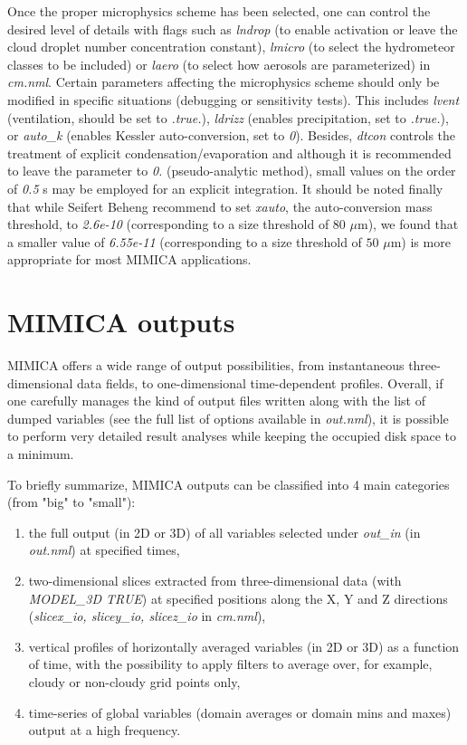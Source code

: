 \documentclass[12pt,A4,french]{article}
\begin{document}
Once the proper microphysics scheme has been selected, one can control the desired level of details with flags such as {\it lndrop} (to enable activation or leave the cloud droplet number concentration constant), {\it lmicro} (to select the hydrometeor classes to be included) or {\it laero} (to select how aerosols are parameterized) in {\it cm.nml}. Certain parameters affecting the microphysics scheme should only be modified in specific situations (debugging or sensitivity tests). This includes {\it lvent} (ventilation, should be set to {\it .true.}), {\it ldrizz} (enables precipitation, set to {\it .true.}), or {\it auto\_k} (enables Kessler auto-conversion, set to {\it 0}). Besides, {\it dtcon} controls the treatment of explicit condensation/evaporation and although it is recommended to leave the parameter to {\it 0.} (pseudo-analytic method), small values on the order of {\it 0.5} s may be employed for an explicit integration. It should be noted finally that while Seifert Beheng recommend to set {\it xauto}, the auto-conversion mass threshold, to {\it 2.6e-10} (corresponding to a size threshold of $80$ $\mu$m), we found that a smaller value of {\it 6.55e-11} (corresponding to a size threshold of $50$ $\mu$m) is more appropriate for most MIMICA applications.

\newpage
\section{MIMICA outputs}
\label{outputs}

MIMICA offers a wide range of output possibilities, from instantaneous three-dimensional data fields, to one-dimensional time-dependent profiles. Overall, if one carefully manages the kind of output files written along with the list of dumped variables (see the full list of options available in {\it out.nml}), it is possible to perform very detailed result analyses while keeping the occupied disk space to a minimum.

To briefly summarize, MIMICA outputs can be classified into 4 main categories (from "big" to "small"):
\begin{enumerate}
    \item the full output (in 2D or 3D) of all variables selected under {\it out\_in} (in {\it out.nml}) at specified times,
    \item two-dimensional slices extracted from three-dimensional data  (with {\it MODEL\_3D TRUE}) at specified positions along the X, Y and Z directions ({\it slicex\_io, slicey\_io, slicez\_io} in {\it cm.nml}),
    \item vertical profiles of horizontally averaged variables (in 2D or 3D) as a function of time, with the possibility to apply filters to average over, for example, cloudy or non-cloudy grid points only, 
    \item time-series of global variables (domain averages or domain mins and maxes) output at a high frequency.
\end{enumerate}
\end{document}
